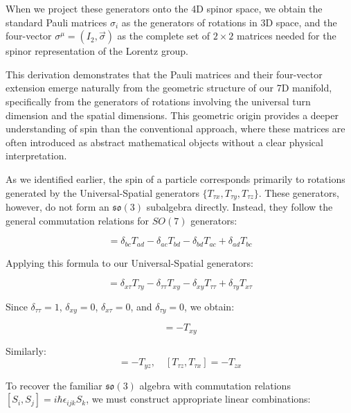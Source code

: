 \documentclass{article}
\begin{document}
When we project these generators onto the 4D spinor space, we obtain the standard Pauli matrices $\sigma_i$ as the generators of rotations in 3D space, and the four-vector $\sigma^\mu = (I_2, \vec{\sigma})$ as the complete set of $2 \times 2$ matrices needed for the spinor representation of the Lorentz group.

This derivation demonstrates that the Pauli matrices and their four-vector extension emerge naturally from the geometric structure of our 7D manifold, specifically from the generators of rotations involving the universal turn dimension and the spatial dimensions. This geometric origin provides a deeper understanding of spin than the conventional approach, where these matrices are often introduced as abstract mathematical objects without a clear physical interpretation.

As we identified earlier, the spin of a particle corresponds primarily to rotations generated by the Universal-Spatial generators $\{T_{\tau x}, T_{\tau y}, T_{\tau z}\}$. These generators, however, do not form an $\mathfrak{so}(3)$ subalgebra directly. Instead, they follow the general commutation relations for $SO(7)$ generators:

\begin{equation}
[T_{ab}, T_{cd}] = \delta_{bc}T_{ad} - \delta_{ac}T_{bd} - \delta_{bd}T_{ac} + \delta_{ad}T_{bc}
\end{equation}

Applying this formula to our Universal-Spatial generators:

\begin{equation}
[T_{\tau x}, T_{\tau y}] = \delta_{x\tau}T_{\tau y} - \delta_{\tau\tau}T_{xy} - \delta_{xy}T_{\tau\tau} + \delta_{\tau y}T_{x\tau}
\end{equation}

Since $\delta_{\tau\tau} = 1$, $\delta_{xy} = 0$, $\delta_{x\tau} = 0$, and $\delta_{\tau y} = 0$, we obtain:

\begin{equation}
[T_{\tau x}, T_{\tau y}] = -T_{xy}
\end{equation}

Similarly:
\begin{equation}
[T_{\tau y}, T_{\tau z}] = -T_{yz}, \quad [T_{\tau z}, T_{\tau x}] = -T_{zx}
\end{equation}

To recover the familiar $\mathfrak{so}(3)$ algebra with commutation relations $[S_i, S_j] = i\hbar\epsilon_{ijk}S_k$, we must construct appropriate linear combinations:
\end{document}
